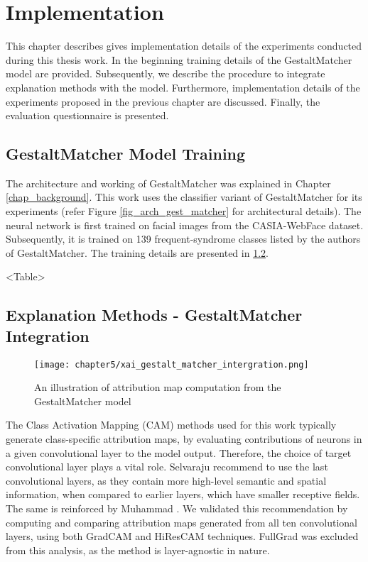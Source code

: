 \documentclass[../report.tex]{subfiles}
\begin{document}
    \chapter{Implementation}\label{ch_implementation}
    This chapter describes gives implementation details of the experiments conducted during this thesis work. In the beginning training details of the GestaltMatcher model are provided. Subsequently, we describe the procedure to integrate explanation methods with the model. Furthermore, implementation details of the experiments proposed in the previous chapter are discussed. Finally, the evaluation questionnaire is presented.
	\section{GestaltMatcher Model Training}
	The architecture and working of GestaltMatcher was explained in Chapter \ref{chap_background}. This work uses the classifier variant of GestaltMatcher for its experiments (refer Figure \ref{fig_arch_gest_matcher} for architectural details). The neural network is first trained on facial images from the CASIA-WebFace \cite{yi2014learning} dataset. Subsequently, it is trained on 139 frequent-syndrome classes listed by the authors of GestaltMatcher. The training details are presented in \ref{}.
	
	<Table>
    \section{Explanation Methods - GestaltMatcher Integration}
     \begin{figure}[H]
    	\hspace*{0.5cm}      
    	\texttt{[image: chapter5/xai\_gestalt\_matcher\_intergration.png]}
    	\caption{An illustration of attribution map computation from the GestaltMatcher model}
    	\label{fig_gm_pipeline}
    \end{figure}
	The Class Activation Mapping (CAM) methods used for this work typically generate class-specific attribution maps, by evaluating contributions of neurons in a given convolutional layer to the model output. Therefore, the choice of target convolutional layer plays a vital role. Selvaraju \etal \cite{selvaraju2017grad} recommend to use the last convolutional layers, as they contain more high-level semantic and spatial information, when compared to earlier layers, which have smaller receptive fields. The same is reinforced by Muhammad \etal \cite{muhammad2020eigen}. We validated this recommendation by computing and comparing attribution maps generated from all ten convolutional layers, using both GradCAM and HiResCAM techniques. FullGrad was excluded from this analysis, as the method is layer-agnostic in nature.
\end{document}
